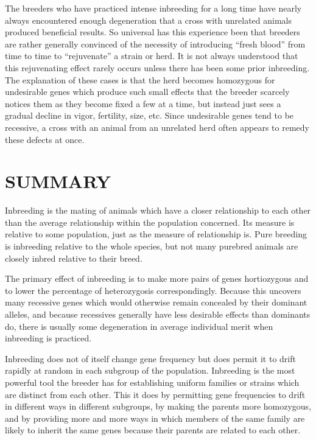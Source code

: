 The breeders who have practiced intense inbreeding for a long time
have nearly always encountered enough degeneration that a cross with
unrelated animals produced beneficial results. So universal has this
experience been that breeders are rather generally convinced of the
necessity of introducing ``fresh blood'' from time to time to ``rejuvenate''
a strain or herd. It is not always understood that this rejuvenating
effect rarely occurs unless there has been some prior inbreeding. The
explanation of these cases is that the herd becomes homozygous for
undesirable genes which produce such small effects that the breeder
scarcely notices them as they become fixed a few at a time, but instead
just sees a gradual decline in vigor, fertility, size, etc. Since undesirable
genes tend to be recessive, a cross with an animal from an unrelated
herd often appears to remedy these defects at once.

\section*{SUMMARY}

Inbreeding is the mating of animals which have a closer relationship
to each other than the average relationship within the population
concerned. Its measure is relative to some population, just as the measure
of relationship is. Pure breeding is inbreeding relative to the whole
species, but not many purebred animals are closely inbred relative to
their breed.

The primary effect of inbreeding is to make more pairs of genes
hortiozygous and to lower the percentage of heterozygosis correspondingly.
Because this uncovers many recessive genes which would otherwise
remain concealed by their dominant alleles, and because recessives
generally have less desirable effects than dominants do, there is usually
some degeneration in average individual merit when inbreeding is
practiced.

Inbreeding does not of itself change gene frequency but does permit
it to drift rapidly at random in each subgroup of the population.
Inbreeding is the most powerful tool the breeder has for establishing
uniform families or strains which are distinct from each other. This
it does by permitting gene frequencies to drift in different ways in different
subgroups, by making the parents more homozygous, and by
providing more and more ways in which members of the same family
are likely to inherit the same genes because their parents are related to
each other.

